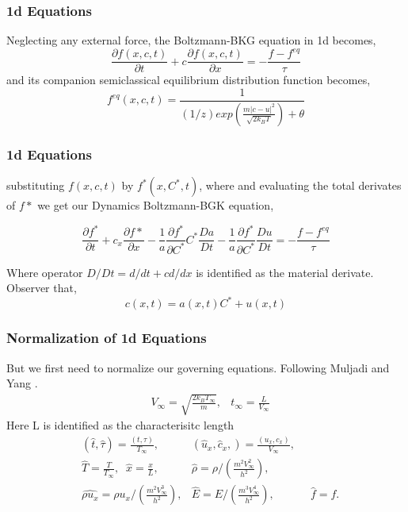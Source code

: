 \begin{frame}
	\frametitle{1d Equations}
	Neglecting any external force, the Boltzmann-BKG equation in 1d becomes,
	\begin{equation}
	\frac{\partial f(x,c,t)}{\partial t} + c \frac{\partial f(x,c,t)}{\partial x} = -\frac{f - f^{eq}}{\tau}
	\end{equation}
	and its companion semiclassical equilibrium distribution function becomes,
	\begin{equation}
	f^{eq} (x,c,t) = \frac{1}{(1/z) exp( \frac{ m \left | c - u \right |^2}{\sqrt{2 k_B T}} )+\theta}
	\end{equation}
\end{frame}

\begin{frame}
	\frametitle{1d Equations}
	substituting $f(x,c,t)$ by $f^*(x,C^*,t)$, where and evaluating the total derivates of $f*$ we get our Dynamics Boltzmann-BGK equation,
	
	\begin{equation}
	\frac{\partial f^*}{\partial t} + c_x \frac{\partial f*}{\partial x} 
		- \frac{1}{a} \frac{\partial f^*}{\partial C^*} C^* \frac{Da}{Dt}
		- \frac{1}{a} \frac{\partial f^*}{\partial C^*} \frac{Du}{Dt}
		= -\frac{f - f^{eq}}{\tau}
	\end{equation}
	
	Where operator $D/Dt = d/dt + c d/dx$ is identified as the material derivate. Observer that, 
	\begin{equation}
		c(x,t) = a(x,t) C^* + u(x,t)
	\end{equation}
	
\end{frame}

\begin{frame}
	\frametitle{Normalization of 1d Equations}
	But we first need to normalize our governing equations. Following Muljadi and Yang \cite{Yang2013}.
	\begin{align*}
	&V_\infty = \sqrt{\frac{2k_BT_\infty}{m}}, &t_\infty = \frac{L}{V_\infty}
	\end{align*}
	Here L is identified as the characterisitc length
	\begin{align*}
	&(\hat t, \hat \tau) = \frac{(t,\tau)}{T_\infty}, &(\hat u_x,\hat c_x,) = \frac{(u_x,c_x)}{V_\infty}, \\
	&\hat T = \frac{T}{T_\infty}, \;\; \hat x = \frac{x}{L}, &\hat \rho = \rho / \left(\frac{m^2V_\infty^2}{h^2} \right ), \\
	&\hat {\rho u_x} = \rho u_x / \left(\frac{m^2V_\infty^3}{h^2} \right ), &\hat E = E / \left(\frac{m^3V_\infty^4}{h^2} \right ), &\;\; \hat f = f.
	\end{align*}
\end{frame}

